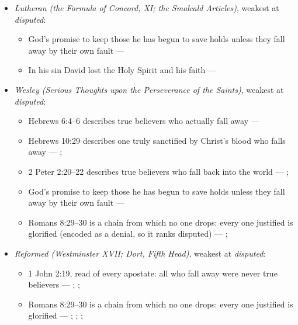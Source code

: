 \documentclass[11pt]{article}
\begin{document}
\begin{itemize}
\begin{itemize}
\end{itemize}
\item \emph{Lutheran (the Formula of Concord, XI; the Smalcald Articles)}, weakest at \emph{disputed}:
\begin{itemize}
\item God’s promise to keep those he has begun to save holds unless they fall away by their own fault --- \cite[Solid Declaration XI.42]{concordia-triglotta-1921}
\item In his sin David lost the Holy Spirit and his faith --- \cite[Smalcald Articles III.iii.43]{concordia-triglotta-1921}
\end{itemize}
\item \emph{Wesley (Serious Thoughts upon the Perseverance of the Saints)}, weakest at \emph{disputed}:
\begin{itemize}
\item Hebrews 6:4–6 describes true believers who actually fall away --- \cite[449]{wesley-works-9-1827}
\item Hebrews 10:29 describes one truly sanctified by Christ’s blood who falls away --- \cite[448--449]{wesley-works-9-1827}; \cite[585]{wesley-explanatory-notes-nt}
\item 2 Peter 2:20–22 describes true believers who fall back into the world --- \cite[445--446]{wesley-works-9-1827}; \cite[625]{wesley-explanatory-notes-nt}
\item God’s promise to keep those he has begun to save holds unless they fall away by their own fault --- \cite[444--445]{wesley-works-9-1827}
\item Romans 8:29–30 is a chain from which no one drops: every one justified is glorified (encoded as a denial, so it ranks disputed) --- \cite[384]{wesley-explanatory-notes-nt}; \cite[413]{wesley-works-9-1827}
\end{itemize}
\item \emph{Reformed (Westminster XVII; Dort, Fifth Head)}, weakest at \emph{disputed}:
\begin{itemize}
\item 1 John 2:19, read of every apostate: all who fall away were never true believers --- \cite[594--595]{owen-works-11-perseverance}; \cite[191--192]{calvin-commentaries-catholic-epistles}; \cite[479--480]{npnf1-05-1887}
\item Romans 8:29–30 is a chain from which no one drops: every one justified is glorified --- \cite[582--583]{schaff-creeds-christendom-3-1977}; \cite[557]{schaff-creeds-christendom-3-1977}; \cite[384]{wesley-explanatory-notes-nt}; \cite[413]{wesley-works-9-1827}

\end{itemize}
\end{itemize}
\end{document}
